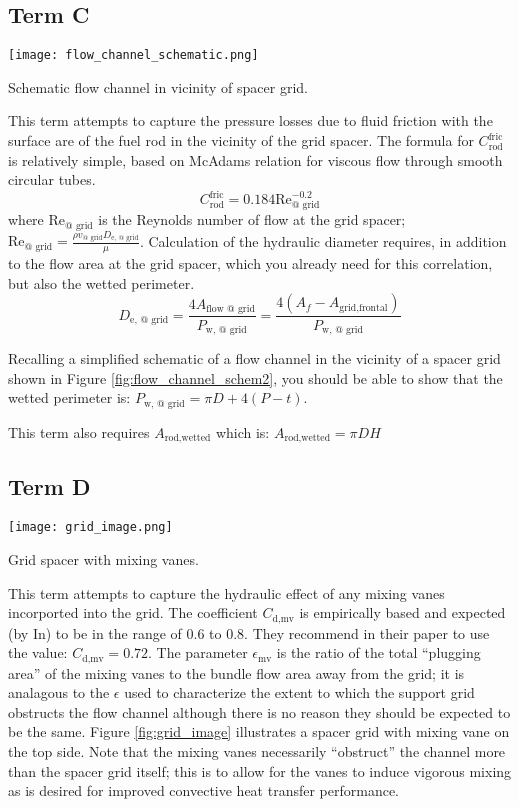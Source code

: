 \subsection{Term C}
\begin{marginfigure}
\texttt{[image: flow\_channel\_schematic.png]}
\caption{Schematic flow channel in vicinity of spacer grid.}
\label{fig:flow_channel_schem2}
\end{marginfigure}
This term attempts to capture the pressure losses due to fluid friction with the surface are of the fuel rod in the vicinity of the grid spacer.  The formula for $C_{\text{rod}}^{\text{fric}}$ is relatively simple, based on McAdams relation for viscous flow through smooth circular tubes.
$$C_{\text{rod}}^{\text{fric}}=0.184 \text{Re}_{\text{@ grid}}^{-0.2}$$
where $\text{Re}_{\text{@ grid}}$ is the Reynolds number of flow at the grid spacer; $\text{Re}_{\text{@ grid}} = \frac{\rho v_{\text{@ grid}} D_{\text{e, @ grid}}}{\mu}$.  Calculation of the hydraulic diameter requires, in addition to the flow area at the grid spacer, which you already need for this correlation, but also the wetted perimeter. 
$$D_{\text{e, @ grid}} =  \frac{4 A_{\text{flow @ grid}}}{P_{\text{w, @ grid}}} = \frac{4(A_f - A_{\text{grid,frontal}}) }{P_{\text{w, @ grid}}} $$

Recalling a simplified schematic of a flow channel in the vicinity of a spacer grid shown in Figure \ref{fig:flow_channel_schem2}, you should be able to show that the wetted perimeter is: $P_{\text{w, @ grid}}=\pi D + 4(P-t)$.

This term also requires $A_{\text{rod,wetted}}$ which is: $A_{\text{rod,wetted}}=\pi D H$
\subsection{Term D}
\begin{marginfigure}
\texttt{[image: grid\_image.png]}
\caption{Grid spacer with mixing vanes.}
\label{fig:grid_image}
\end{marginfigure}
This term attempts to capture the hydraulic effect of any mixing vanes incorported into the grid.  The coefficient $C_{\text{d,mv}}$ is empirically based and expected (by In) to be in the range of 0.6 to 0.8.  They recommend in their paper to use the value: $C_{\text{d,mv}} = 0.72$.  The parameter $\epsilon_{\text{mv}}$ is the ratio of the total ``plugging area'' of the mixing vanes to the bundle flow area away from the grid; it is analagous to the $\epsilon$ used to characterize the extent to which the support grid obstructs the flow channel although there is no reason they should be expected to be the same.  Figure \ref{fig:grid_image} illustrates a spacer grid with mixing vane on the top side.\cite{CHEN20161416}  Note that the mixing vanes necessarily ``obstruct'' the channel more than the spacer grid itself; this is to allow for the vanes to induce vigorous mixing as is desired for improved convective heat transfer performance.

